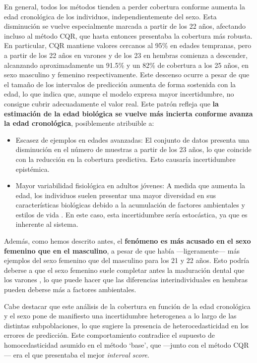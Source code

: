 En general, todos los métodos tienden a perder cobertura conforme aumenta la edad cronológica de los individuos, independientemente del sexo. Esta disminución se vuelve especialmente marcada a partir de los 22 años, afectando incluso al método \acrshort{CQR}, que hasta entonces presentaba la cobertura más robusta. En particular, \acrshort{CQR} mantiene valores cercanos al 95\% en edades tempranas, pero a partir de los 22 años en varones y de los 23 en hembras comienza a descender, alcanzando aproximadamente un 91.5\% y un 82\% de cobertura a los 25 años, en sexo masculino y femenino respectivamente. Este descenso ocurre a pesar de que el tamaño de los intervalos de predicción aumenta de forma sostenida con la edad, lo que indica que, aunque el modelo expresa mayor incertidumbre, no consigue cubrir adecuadamente el valor real. Este patrón refleja que \textbf{la estimación de la edad biológica se vuelve más incierta conforme avanza la edad cronológica}, posiblemente atribuible a:

\begin{itemize}

    \item Escasez de ejemplos en edades avanzadas: El conjunto de datos presenta una disminución en el número de muestras a partir de los 23 años, lo que coincide con la reducción en la cobertura predictiva. Esto causaría incertidumbre epistémica.
    
    \item Mayor variabilidad fisiológica en adultos jóvenes: A medida que aumenta la edad, los individuos suelen presentar una mayor diversidad en sus características biológicas debido a la acumulación de factores ambientales y estilos de vida \cite{ubelaker2018, scheuer2004}. En este caso, esta incertidumbre sería estocástica, ya que es inherente al sistema. 

\end{itemize}

Además, como hemos descrito antes, el \textbf{fenómeno es más acusado en el sexo femenino que en el masculino}, a pesar de que había ---ligeramente--- más ejemplos del sexo femenino que del masculino para los 21 y 22 años. Esto podría deberse a que el sexo femenino suele completar antes la maduración dental que los varones \cite{scheuer2004}, lo que puede hacer que las diferencias interindividuales en hembras pueden deberse más a factores ambientales.

Cabe destacar que este análisis de la cobertura en función de la edad cronológica y el sexo pone de manifiesto una incertidumbre heterogenea a lo largo de las distintas subpoblaciones, lo que sugiere la presencia de heterocedasticidad en los errores de predicción. Este comportamiento contradice el supuesto de homocedasticidad asumido en el método `base', que ---junto con el método CQR--- era el que presentaba el mejor \textit{interval score}.

